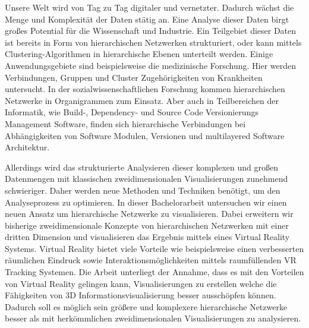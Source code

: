 Unsere Welt wird von Tag zu Tag digitaler und vernetzter. Dadurch wächst die Menge und Komplexität der Daten stätig an.
Eine Analyse dieser Daten birgt großes Potential für die Wissenschaft und Industrie.
Ein Teilgebiet dieser Daten ist bereits in Form von hierarchischen Netzwerken strukturiert, oder kann mittels Clustering-Algorithmen in hierarchische Ebenen unterteilt werden. Einige Anwendungsgebiete sind beispielsweise die medizinische Forschung. Hier werden Verbindungen, Gruppen und Cluster Zugehörigkeiten von Krankheiten untersucht. In der sozialwissenschaftlichen Forschung kommen hierarchischen Netzwerke in Organigrammen zum Einsatz. Aber auch in Teilbereichen der Informatik, wie Build-, Dependency- und Source Code Versionierungs Management Software, finden sich hierarchische Verbindungen bei Abhängigkeiten von Software Modulen, Versionen und multilayered Software Architektur. 

Allerdings wird das strukturierte Analysieren dieser komplexen und großen Datenmengen mit klassischen zweidimensionalen Visualisierungen zunehmend schwieriger.
Daher werden neue Methoden und Techniken benötigt, um den Analyseprozess zu optimieren. In dieser Bachelorarbeit untersuchen wir einen neuen Ansatz um hierarchische Netzwerke zu visualisieren. Dabei erweitern wir bisherige zweidimensionale Konzepte von hierarchischen Netzwerken mit einer dritten Dimension und visualisieren das Ergebnis mittels eines Virtual Reality Systems. Virtual Reality bietet viele Vorteile wie beispielsweise einen verbesserten räumlichen Eindruck sowie Interaktionsmöglichkeiten mittels raumfüllenden VR Tracking Systemen. 
Die Arbeit unterliegt der Annahme, dass es mit den Vorteilen von Virtual Reality gelingen kann, Visualisierungen zu erstellen welche die Fähigkeiten von 3D Informationsvisualisierung besser ausschöpfen können. Dadurch soll es möglich sein größere und komplexere hierarchische Netzwerke besser als mit herkömmlichen zweidimensionalen Visualisierungen zu analysieren.